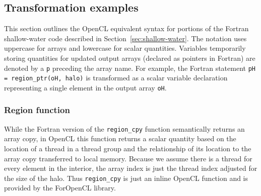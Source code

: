 



\subsection{Transformation examples}

This section outlines the OpenCL equivalent syntax for portions of the
Fortran shallow-water code described in
Section~\ref{sec:shallow-water}.  The notation uses uppercase for
arrays and lowercase for scalar quantities.  Variables temporarily
storing quantities for updated output arrays (declared as pointers in
Fortran) are denoted by a {\tt p} preceding the array name.  For
example, the Fortran statement {\tt pH = region\_ptr(oH, halo)} is
transformed as a scalar variable declaration representing a single
element in the output array {\tt oH}.


\subsubsection{Region function}

While the Fortran version of the {\tt region\_cpy} function
semantically returns an array copy, in OpenCL this function returns a
scalar quantity based on the location of a thread in a thread group
and the relationship of its location to the array copy transferred to
local memory.  Because we assume there is a thread for every element
in the interior, the array index is just the thread index adjusted for
the size of the halo.  Thus {\tt region\_cpy} is just an inline OpenCL
function and is provided by the ForOpenCL library.

